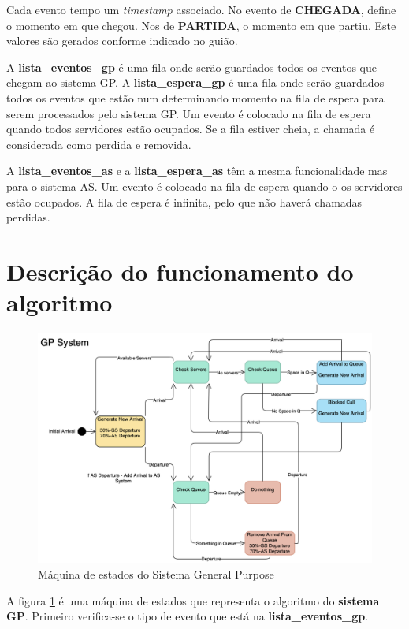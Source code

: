 Cada evento tempo um \textit{timestamp} associado.
No evento de \textbf{CHEGADA}, define o momento em que chegou.
Nos de \textbf{PARTIDA}, o momento em que partiu.
Este valores são gerados conforme indicado no guião.
\newline

\noindent
A \textbf{lista\_eventos\_gp} é uma fila onde serão guardados todos os eventos que chegam ao sistema GP.
A \textbf{lista\_espera\_gp} é uma fila onde serão guardados todos os eventos que estão num determinando momento na fila de espera para serem processados pelo sistema GP.
Um evento é colocado na fila de espera quando todos servidores estão ocupados.
Se a fila estiver cheia, a chamada é considerada como perdida e removida.

A \textbf{lista\_eventos\_as} e a \textbf{lista\_espera\_as} têm a mesma funcionalidade mas para o sistema AS.
Um evento é colocado na fila de espera quando o os servidores estão ocupados.
A fila de espera é infinita, pelo que não haverá chamadas perdidas.

\section*{Descrição do funcionamento do algoritmo}

\begin{figure}[H]
    \centering
    \includegraphics[width=.9\linewidth]{figs/intro/sm_gp.png}
    \caption{Máquina de estados do Sistema General Purpose}
    \label{fig:sm_gp}
\end{figure}

A figura \ref{fig:sm_gp} é uma máquina de estados que representa o algoritmo do \textbf{sistema GP}.
Primeiro verifica-se o tipo de evento que está na \textbf{lista\_eventos\_gp}.

